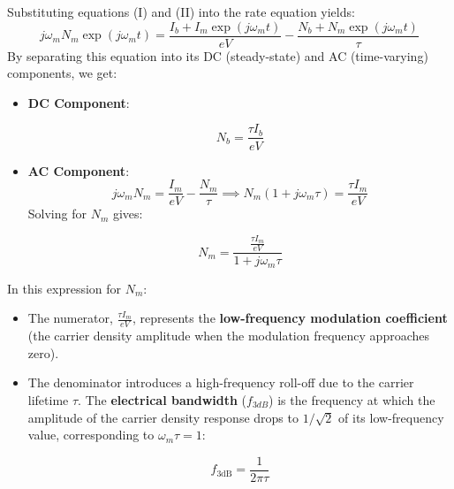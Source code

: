 Substituting equations \textup{(I)} and \textup{(II)} into the rate equation yields:
\begin{equation*}
    j\omega_m N_m \exp(j\omega_m t) = \frac{I_b + I_m \exp(j\omega_m t)}{eV} - \frac{N_b + N_m \exp(j\omega_m t)}{\tau}
\end{equation*}
By separating this equation into its DC (steady-state) and AC (time-varying) components, we get:
\begin{itemize}
    \item \textbf{DC Component}:
    \begin{keyresult}
        \begin{equation}
            N_b = \frac{\tau I_b}{eV}
        \end{equation}
    \end{keyresult}
    \item \textbf{AC Component}:
    \begin{equation*}
        j\omega_m N_m = \frac{I_m}{eV} - \frac{N_m}{\tau} \implies N_m\left(1 + j\omega_m\tau\right) = \frac{\tau I_m}{eV}
    \end{equation*}
    Solving for $N_m$ gives:
    \begin{keyresult}
        \begin{equation}
            N_m = \frac{\frac{\tau I_m}{eV}}{1 + j\omega_m\tau}
        \end{equation}
    \end{keyresult}
\end{itemize}

In this expression for $N_m$:
\begin{itemize}
    \item The numerator, $\frac{\tau I_m}{eV}$, represents the \textbf{low-frequency modulation coefficient} (the carrier density amplitude when the modulation frequency approaches zero).
    \item The denominator introduces a high-frequency roll-off due to the carrier lifetime $\tau$. The \textbf{electrical bandwidth} ($f_{3dB}$) is the frequency at which the amplitude of the carrier density response drops to $1/\sqrt{2}$ of its low-frequency value, corresponding to $\omega_m\tau = 1$:
    \begin{keyresult}
        \begin{equation}
            f_{3\text{dB}} = \frac{1}{2\pi\tau}
        \end{equation}
    \end{keyresult}
\end{itemize}

